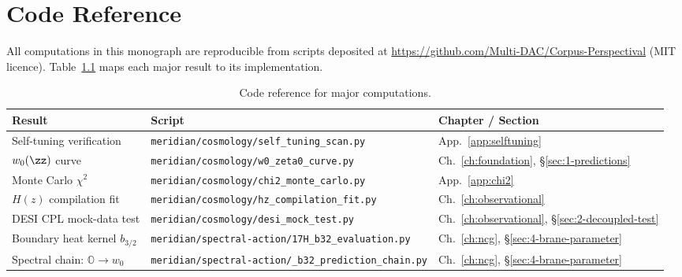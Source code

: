 
\chapter{Code Reference}
\label{app:code-reference}

All computations in this monograph are reproducible from scripts deposited at \url{https://github.com/Multi-DAC/Corpus-Perspectival} (MIT licence). Table~\ref{tab:code-ref} maps each major result to its implementation.

\begin{table}[h!]
\caption{Code reference for major computations.}
\label{tab:code-ref}
\footnotesize
\renewcommand{\arraystretch}{1.30}
\begin{tabular}{@{}p{3.8cm}p{6.5cm}p{4.2cm}@{}}
\toprule
\textbf{Result} & \textbf{Script} & \textbf{Chapter / Section} \\
\midrule

Self-tuning verification &
\texttt{meridian/cosmology/\allowbreak self\_tuning\_scan.py} &
App.~\ref{app:selftuning} \\

$w_0(\zz)$ curve &
\texttt{meridian/cosmology/\allowbreak w0\_zeta0\_curve.py} &
Ch.~\ref{ch:foundation}, \S\ref{sec:1-predictions} \\

Monte Carlo $\chi^2$ &
\texttt{meridian/cosmology/\allowbreak chi2\_monte\_carlo.py} &
App.~\ref{app:chi2} \\

$H(z)$ compilation fit &
\texttt{meridian/cosmology/\allowbreak hz\_compilation\_fit.py} &
Ch.~\ref{ch:observational} \\

DESI CPL mock-data test &
\texttt{meridian/cosmology/\allowbreak desi\_mock\_test.py} &
Ch.~\ref{ch:observational}, \S\ref{sec:2-decoupled-test} \\

Boundary heat kernel $b_{3/2}$ &
\texttt{meridian/spectral-action/\allowbreak 17H\_b32\_evaluation.py} &
Ch.~\ref{ch:ncg}, \S\ref{sec:4-brane-parameter} \\

Spectral chain: $\mathbb{O} \to w_0$ &
\texttt{meridian/spectral-action/\allowbreak 17\_b32\_prediction\_chain.py} &
Ch.~\ref{ch:ncg}, \S\ref{sec:4-brane-parameter} \\


\end{tabular}
\end{table}
